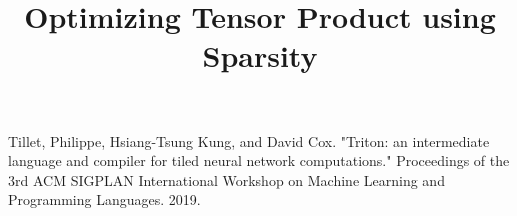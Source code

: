 \documentclass[conference]{IEEEtran}
\begin{document}
\title{Optimizing Tensor Product using Sparsity}

\author{
\and
{}
\and
{}
}

\maketitle

\begin{abstract}

\end{abstract}






\begin{thebibliography}{00}
 Tillet, Philippe, Hsiang-Tsung Kung, and David Cox. "Triton: an intermediate language and compiler for tiled neural network computations." Proceedings of the 3rd ACM SIGPLAN International Workshop on Machine Learning and Programming Languages. 2019.
\end{thebibliography}
\vspace{12pt}
\end{document}
